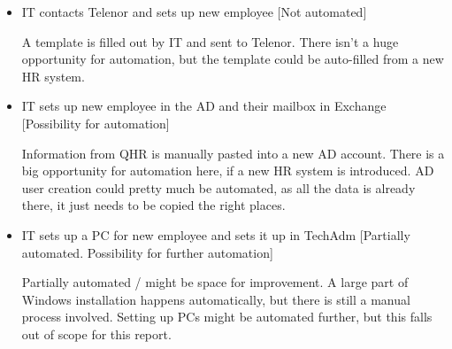 \begin{itemize}
	\item{IT contacts Telenor and sets up new employee} [Not automated]
	
		A template is filled out by IT and sent to Telenor. There isn't a huge opportunity for automation, but the template could be auto-filled from a new HR system.
	
	\item{IT sets up new employee in the AD and their mailbox in Exchange} [Possibility for automation]
	
		Information from QHR is manually pasted into a new AD account. There is a big opportunity for automation here, if a new HR system is introduced. AD user creation could pretty much be automated, as all the data is already there, it just needs to be copied the right places.
	
	\item{IT sets up a PC for new employee and sets it up in TechAdm} [Partially automated. Possibility for further automation]
	
		Partially automated / might be space for improvement. A large part of Windows installation happens automatically, but there is still a manual process involved.
		Setting up PCs might be automated further, but this falls out of scope for this report.
	
\end{itemize}